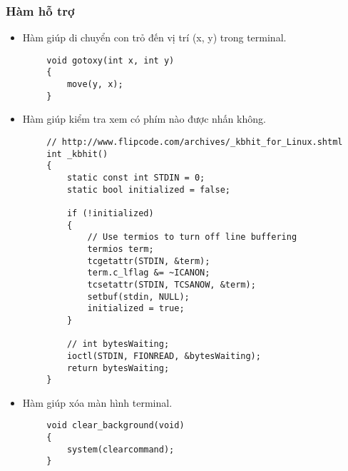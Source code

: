 \documentclass[a4paper, 12pt]{article}
\begin{document}
\subsubsection{Hàm hỗ trợ}
\begin{center}
    \begin{itemize}
        \item Hàm giúp di chuyển con trỏ đến vị trí (x, y) trong terminal.
    \end{itemize}
    
    \begin{lstlisting}
        void gotoxy(int x, int y)
        {
            move(y, x);
        }
    \end{lstlisting}
\end{center}

\begin{center}
    \begin{itemize}
        \item Hàm giúp kiểm tra xem có phím nào được nhấn không.
    \end{itemize}
    
    \begin{lstlisting}
        // http://www.flipcode.com/archives/_kbhit_for_Linux.shtml
        int _kbhit()
        {
            static const int STDIN = 0;
            static bool initialized = false;
        
            if (!initialized)
            {
                // Use termios to turn off line buffering
                termios term;
                tcgetattr(STDIN, &term);
                term.c_lflag &= ~ICANON;
                tcsetattr(STDIN, TCSANOW, &term);
                setbuf(stdin, NULL);
                initialized = true;
            }
        
            // int bytesWaiting;
            ioctl(STDIN, FIONREAD, &bytesWaiting);
            return bytesWaiting;
        }
    \end{lstlisting}
\end{center}

\begin{center}
    \begin{itemize}
        \item Hàm giúp xóa màn hình terminal.
    \end{itemize}
    
    \begin{lstlisting}
        void clear_background(void)
        {
            system(clearcommand);
        }
    \end{lstlisting}
\end{center}
\end{document}
